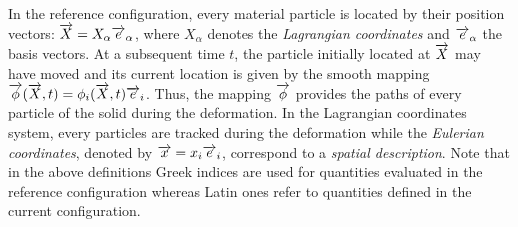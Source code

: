 In the reference configuration, every material particle is located by their position vectors: ${\overrightarrow{X}}=X_\alpha {\overrightarrow{e}}_\alpha$, where $X_\alpha$ denotes the \textit{Lagrangian coordinates} and ${\overrightarrow{e}}_\alpha$ the basis vectors. At a subsequent time $t$, the particle initially located at ${\overrightarrow{X}}$ may have moved and its current location is given by the smooth mapping ${\overrightarrow{\phi}}({\overrightarrow{X}},t)=\phi_i({\overrightarrow{X}},t){\overrightarrow{e}}_i$. Thus, the mapping ${\overrightarrow{\phi}}$ provides the paths of every particle of the solid during the deformation. In the Lagrangian coordinates system, every particles are tracked during the deformation while the \textit{Eulerian coordinates}, denoted by ${\overrightarrow{x}}=x_i{\overrightarrow{e}}_i$, correspond to a \textit{spatial description}.
Note that in the above definitions Greek indices are used for quantities evaluated in the reference configuration whereas Latin ones refer to quantities defined in the current configuration. 

